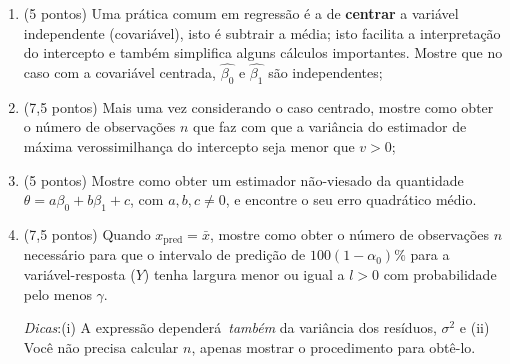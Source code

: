 \documentclass[a4paper,10pt, notitlepage]{report}
\begin{document}
\begin{enumerate}[label=\alph*)]
 \item (5 pontos) Uma prática comum em regressão é a de \textbf{centrar} a variável independente (covariável), isto é subtrair a média; isto facilita a interpretação do intercepto e também simplifica alguns cálculos importantes.
 Mostre que no caso com a covariável centrada, $\hat{\beta_0}$ e $\hat{\beta_1}$ são independentes;
 \item (7,5 pontos) Mais uma vez considerando o caso centrado, mostre 
 como obter o número de observações $n$ que faz com que a variância do estimador de máxima verossimilhança do intercepto seja menor que $v > 0$;
 \item (5 pontos) Mostre como obter um estimador não-viesado da quantidade $\theta = a\beta_0 + b\beta_1 + c$, com $a, b, c \neq 0$, e encontre o seu erro quadrático médio.
 \item (7,5 pontos)  Quando $x_{\text{pred}} = \bar{x}$, mostre como obter  o número de observações $n$ necessário para que o intervalo de predição de $100(1-\alpha_0)\%$ para a variável-resposta ($Y$) tenha largura menor ou igual a $l>0$ com probabilidade pelo menos $\gamma$.
 
 \textit{Dicas}:(i) A expressão dependerá~\textit{também} da variância dos resíduos, $\sigma^2$ e (ii) Você não precisa calcular $n$, apenas mostrar o procedimento para obtê-lo.
 
 \end{enumerate}

\newpage
\end{document}
